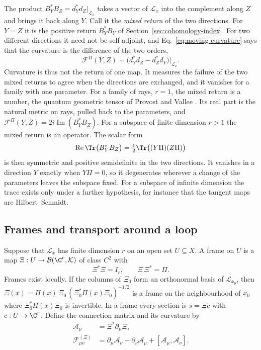 The product $B_Y^*B_Z=d_Y^*d_Z|_{\mathcal L_x}$ takes a vector of $\mathcal L_x$ into the complement along $Z$ and brings it back along $Y$. Call it the \emph{mixed return} of the two directions. For $Y=Z$ it is the positive return $B_Y^*B_Y$ of Section~\ref{sec:cohomology-index}. For two different directions it need not be self-adjoint, and Eq.~\eqref{eq:moving-curvature} says that the curvature is the difference of the two orders,
\begin{equation}
 \mathcal F^\Pi(Y,Z)=\bigl(d_Y^*d_Z-d_Z^*d_Y\bigr)\big|_{\mathcal L_x}.
 \label{eq:moving-mixed-return}
\end{equation}
Curvature is thus not the return of one map. It measures the failure of the two mixed returns to agree when the directions are exchanged, and it vanishes for a family with one parameter. For a family of rays, $r=1$, the mixed return is a number, the quantum geometric tensor of Provost and Vallee \cite{ProvostVallee1980}. Its real part is the natural metric on rays, pulled back to the parameters, and $\mathcal F^\Pi(Y,Z)=2i\operatorname{Im}(B_Y^*B_Z)$. For a subspace of finite dimension $r>1$ the mixed return is an operator. The scalar form
\begin{equation}
 \operatorname{Re}\Tr\bigl(B_Y^*B_Z\bigr)=\tfrac12\Tr\bigl((Y\Pi)(Z\Pi)\bigr)
 \label{eq:moving-scalar-form}
\end{equation}
is then symmetric and positive semidefinite in the two directions. It vanishes in a direction $Y$ exactly when $Y\Pi=0$, so it degenerates wherever a change of the parameters leaves the subspace fixed. For a subspace of infinite dimension the trace exists only under a further hypothesis, for instance that the tangent maps are Hilbert--Schmidt.

\subsection{Frames and transport around a loop}
\label{subsec:moving-frames}

Suppose that $\mathcal L_x$ has finite dimension $r$ on an open set $U\subseteq X$. A frame on $U$ is a map $\Xi:U\to\mathcal B(\C^r,\mathcal K)$ of class $C^2$ with
\begin{equation}
 \Xi^*\Xi=I_r,\qquad \Xi\,\Xi^*=\Pi .
 \label{eq:moving-frame}
\end{equation}
Frames exist locally. If the columns of $\Xi_0$ form an orthonormal basis of $\mathcal L_{x_0}$, then $\Xi(x)=\Pi(x)\,\Xi_0\,(\Xi_0^*\Pi(x)\Xi_0)^{-1/2}$ is a frame on the neighbourhood of $x_0$ where $\Xi_0^*\Pi(x)\Xi_0$ is invertible. In a frame every section is $s=\Xi c$ with $c:U\to\C^r$. Define the connection matrix and its curvature by
\begin{align}
 \mathcal A_\mu&=\Xi^*\partial_\mu\Xi ,
 \label{eq:moving-connection-matrix}\\
 \mathcal F^{(\Xi)}_{\mu\nu}&=\partial_\mu\mathcal A_\nu-\partial_\nu\mathcal A_\mu+[\mathcal A_\mu,\mathcal A_\nu].
 \label{eq:moving-frame-curvature}
\end{align}

